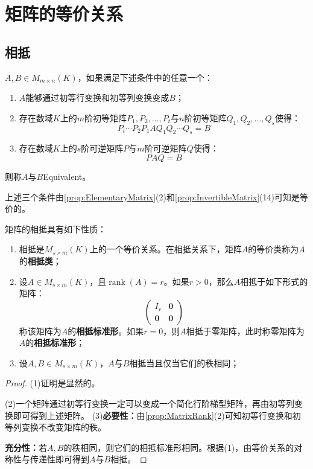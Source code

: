 \section{矩阵的等价关系}

\subsection{相抵}
\begin{definition}
	$A,B\in M_{m\times n}(K)$，如果满足下述条件中的任意一个：
	\begin{enumerate}
		\item $A$能够通过初等行变换和初等列变换变成$B$；
		\item 存在数域$K$上的$m$阶初等矩阵$P_1,P_2,\dots,P_t$与$n$阶初等矩阵$Q_1,Q_2,\dots,Q_s$使得：
		\begin{equation*}
			P_t\cdots P_2P_1AQ_1Q_2\cdots Q_s=B
		\end{equation*}
		\item 存在数域$K$上的$s$阶可逆矩阵$P$与$m$阶可逆矩阵$Q$使得：
		\begin{equation*}
			PAQ=B
		\end{equation*}
	\end{enumerate}
	则称$A$与$B$\gls{Equivalent}。
\end{definition}
上述三个条件由\cref{prop:ElementaryMatrix}(2)和\cref{prop:InvertibleMatrix}(14)可知是等价的。
\begin{property}\label{prop:EquivalentMatrix}
	矩阵的相抵具有如下性质：
	\begin{enumerate}
		\item 相抵是$M_{s\times m}(K)$上的一个等价关系。在相抵关系下，矩阵$A$的等价类称为$A$的\textbf{相抵类}；
		\item 设$A\in M_{s\times m}(K)$，且$\operatorname{rank}(A)=r$。如果$r>0$，那么$A$相抵于如下形式的矩阵：
		\begin{equation*}
			\begin{pmatrix}
				I_r & \mathbf{0} \\
				\mathbf{0} & \mathbf{0}
			\end{pmatrix}
		\end{equation*}
		称该矩阵为$A$的\textbf{相抵标准形}。如果$r=0$，则$A$相抵于零矩阵，此时称零矩阵为$A$的\textbf{相抵标准形}；
		\item 设$A,B\in M_{s\times m}(K)$，$A$与$B$相抵当且仅当它们的秩相同；
	\end{enumerate}
\end{property}
\begin{proof}
	(1)证明是显然的。\par
	(2)一个矩阵通过初等行变换一定可以变成一个简化行阶梯型矩阵，再由初等列变换即可得到上述矩阵。
	(3)\textbf{必要性：}由\cref{prop:MatrixRank}(2)可知初等行变换和初等列变换不改变矩阵的秩。\par
	\textbf{充分性：}若$A,B$的秩相同，则它们的相抵标准形相同。根据(1)，由等价关系的对称性与传递性即可得到$A$与$B$相抵。
\end{proof}

